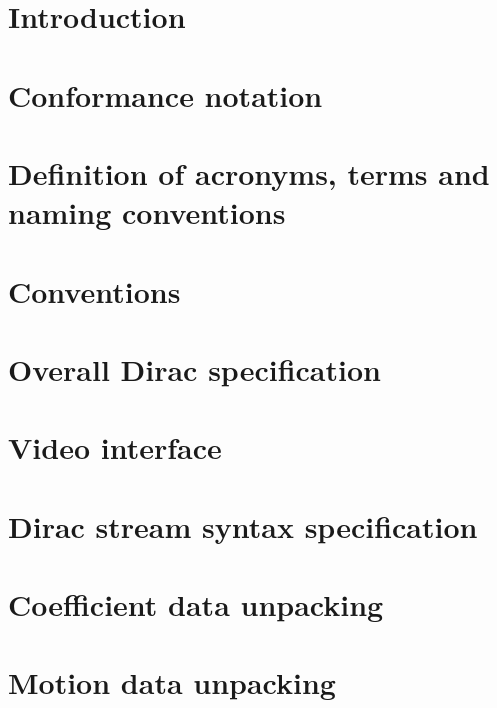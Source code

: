 
\section{Introduction}

\clearpage
\section{Conformance notation}

\clearpage
\section{Definition of acronyms, terms and naming conventions}

\clearpage
\section{Conventions}

\clearpage
\section{Overall Dirac specification}

\clearpage
\section{Video interface}

\clearpage
\section{Dirac stream syntax specification}

\clearpage
\section{Coefficient data unpacking}

\clearpage
\section{Motion data unpacking}


